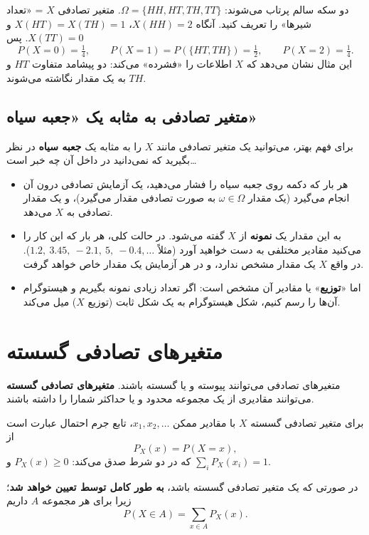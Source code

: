 \begin{example}
دو سکه سالم پرتاب می‌شوند: $\Omega=\{HH,HT,TH,TT\}$. متغیر تصادفی $X$ = «تعداد شیرها» را تعریف کنید. آنگاه
$X(HH)=2$، $X(HT)=X(TH)=1$ و $X(TT)=0$. پس
\[
P(X=0)=\tfrac14,\qquad P(X=1)=P(\{HT,TH\})=\tfrac12,\qquad P(X=2)=\tfrac14 .
\]
این مثال نشان می‌دهد که $X$ اطلاعات را «فشرده» می‌کند: دو پیشامد متفاوت $HT$ و $TH$ به یک مقدار نگاشته می‌شوند.
\end{example}

\subsection{متغیر تصادفی به مثابه یک «جعبه سیاه»}
برای فهم بهتر، می‌توانید یک متغیر تصادفی مانند $X$ را به مثابه یک \textbf{جعبه سیاه} در نظر بگیرید که نمی‌دانید در داخل آن چه خبر است\ldots
\begin{itemize}
\item هر بار که دکمه روی جعبه سیاه را فشار می‌دهید، یک آزمایش تصادفی درون آن انجام می‌گیرد (یک مقدار $\omega\in\Omega$ به صورت تصادفی مقدار می‌گیرد)، و یک مقدار تصادفی به $X$ می‌دهد.
\item به این مقدار یک \textbf{نمونه} از $X$ گفته می‌شود. در حالت کلی، هر بار که این کار را می‌کنید مقادیر مختلفی به دست خواهید آورد (مثلاً $1.2,\ 3.45,\ -2.1,\ 5,\ -0.4,\ldots$). در واقع $X$ یک مقدار مشخص ندارد، و در هر آزمایش یک مقدار خاص خواهد گرفت.
\item اما «\textbf{توزیع}» یا  مقادیر آن مشخص است: اگر تعداد زیادی نمونه بگیریم و هیستوگرام آن‌ها را رسم کنیم، شکل هیستوگرام به یک شکل ثابت (توزیع $X$) میل می‌کند.
\end{itemize}

\section{متغیرهای تصادفی گسسته }

متغیرهای تصادفی می‌توانند پیوسته و یا گسسته باشند. \textbf{متغیرهای تصادفی گسسته} می‌توانند مقادیری از یک مجموعه محدود و یا حداکثر شمارا را داشته باشند.

\begin{definition}
برای متغیر تصادفی گسسته $X$ با مقادیر ممکن $x_1,x_2,\ldots$، تابع جرم احتمال عبارت است از
\[
P_X(x)=P(X=x),
\]
که در دو شرط صدق می‌کند: $P_X(x)\ge0$ و $\sum_i P_X(x_i)=1$.
\end{definition}

در صورتی که یک متغیر تصادفی گسسته باشد، \textbf{به طور کامل توسط  تعیین خواهد شد}؛ زیرا برای هر مجموعه $A$ داریم
\[P(X\in A)=\sum_{x\in A}P_X(x).\]


